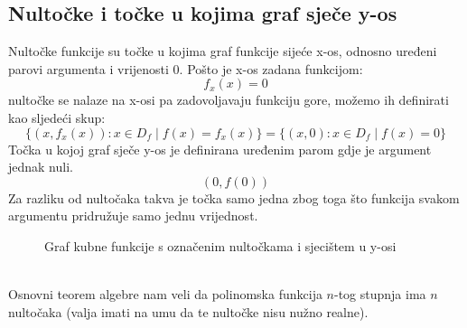 \subsection{Nultočke i točke u kojima graf sječe y-os \label{nultočke}}
    Nultočke funkcije su točke u kojima graf funkcije sijeće x-os, odnosno uređeni parovi argumenta i vrijenosti \(0\).
    Pošto je x-os zadana funkcijom:
    \[f_x(x) = 0\]
    nultočke se nalaze na x-osi pa zadovoljavaju funkciju gore, možemo ih definirati kao sljedeći skup:
    \[\{(x, f_x(x)) \colon x \in D_f \mid f(x) = f_x(x)\} = \{(x, 0) \colon x \in D_f \mid f(x) = 0\}\]
    \clearpage
    \noindent Točka u kojoj graf sječe y-os je definirana uređenim parom gdje je argument jednak nuli.
    \[(0, f(0))\]
    Za razliku od nultočaka takva je točka samo jedna zbog toga što funkcija svakom argumentu pridružuje samo jednu vrijednost.
    \begin{figure}[ht]
        \centering
        \caption{Graf kubne funkcije s označenim nultočkama i sjecištem u y-osi} 
        \label{fig:template}
    \end{figure}
    \\
    Osnovni teorem algebre nam veli da polinomska funkcija \(n\)-tog stupnja ima \(n\) nultočaka (valja imati na umu da te nultočke nisu nužno realne).


